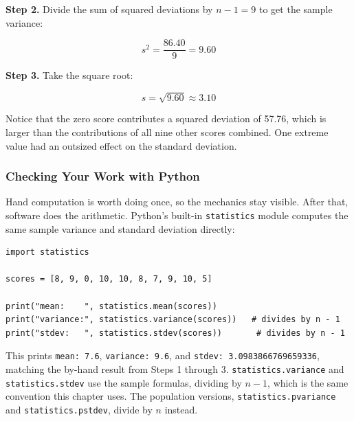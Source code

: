 \textbf{Step 2.} Divide the sum of squared deviations by $n - 1 = 9$
to get the sample variance:

\[
s^2 = \frac{86.40}{9} = 9.60
\]

\textbf{Step 3.} Take the square root:

\[
s = \sqrt{9.60} \approx 3.10
\]

Notice that the zero score contributes a squared
deviation of 57.76, which is larger than the contributions of all nine
other scores combined. One extreme value had an outsized effect on the
standard deviation. 

\subsubsection*{Checking Your Work with Python}

Hand computation is worth doing once, so the mechanics stay visible.
After that, software does the arithmetic. Python's built-in
\texttt{statistics} module computes the same sample variance and
standard deviation directly:

\begin{verbatim}
import statistics

scores = [8, 9, 0, 10, 10, 8, 7, 9, 10, 5]

print("mean:    ", statistics.mean(scores))
print("variance:", statistics.variance(scores))   # divides by n - 1
print("stdev:   ", statistics.stdev(scores))       # divides by n - 1
\end{verbatim}

This prints \texttt{mean: 7.6}, \texttt{variance: 9.6}, and
\texttt{stdev: 3.0983866769659336}, matching the by-hand result from
Steps 1 through 3. \texttt{statistics.variance} and
\texttt{statistics.stdev} use the sample formulas, dividing by
$n - 1$, which is the same convention this chapter uses. The
population versions, \texttt{statistics.pvariance} and
\texttt{statistics.pstdev}, divide by $n$ instead.

